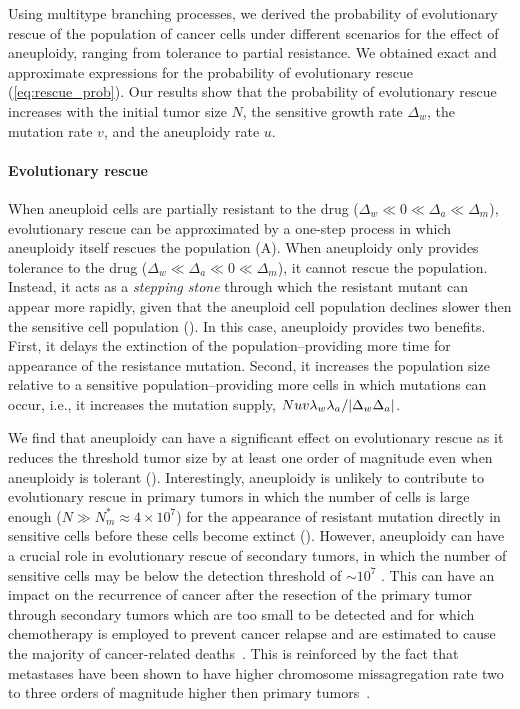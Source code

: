 \documentclass[12pt]{extarticle}
\begin{document}
Using multitype branching processes, we derived the probability of evolutionary rescue of the population of cancer cells under different scenarios for the effect of aneuploidy, ranging from tolerance to partial resistance.
We obtained exact and approximate expressions for the probability of evolutionary rescue (\cref{eq:rescue_prob}). 
Our results show that the probability of evolutionary rescue increases with the initial tumor size $N$, the sensitive growth rate $\Delta_w$, the mutation rate $v$, and the aneuploidy rate $u$.

\paragraph{Evolutionary rescue}
When aneuploid cells are partially resistant to the drug ($\Delta_w\ll0\ll\Delta_a\ll\Delta_m$), evolutionary rescue can be approximated by a one-step process in which aneuploidy itself rescues the population (A). 
When aneuploidy only provides tolerance to the drug ($\Delta_w\ll\Delta_a\ll0\ll\Delta_m$), it cannot rescue the population.
Instead, it acts as a \emph{stepping stone} through which the resistant mutant can appear more rapidly, given that the aneuploid cell population declines slower then the sensitive cell population (). In this case, aneuploidy provides two benefits. First, it delays the extinction of the population--providing more time for appearance of the resistance mutation. Second, it increases the population size relative to a sensitive population--providing more cells in which mutations can occur, i.e., it increases the mutation supply, $Nuv\lambda_w\lambda_a/\abs{\Delta_w\Delta_a}$.

We find that aneuploidy can have a significant effect on evolutionary rescue as it reduces the threshold tumor size by at least one order of magnitude even when aneuploidy is tolerant (). Interestingly, aneuploidy is unlikely to contribute to evolutionary rescue in primary tumors in which the number of cells is large enough ($N\gg N_m^*\approx 4\times10^7$) for the appearance of resistant mutation directly in sensitive cells before these cells become extinct ().
However, aneuploidy can have a crucial role in evolutionary rescue of secondary tumors, in which the number of sensitive cells may be below the detection threshold of $\sim10^7$  \citep{bozic2013evolutionary}. This can have an impact on the recurrence of cancer after the resection of the primary tumor  through secondary tumors which are too small to be detected and for which chemotherapy is employed to prevent  cancer relapse and are estimated to cause the majority of cancer-related deaths~\citep{chaffer2011perspective}. This is reinforced by the fact that metastases have been shown to have higher chromosome missagregation rate two to three orders of magnitude higher then primary tumors~\citep{kimmel2023intra}.
\end{document}
